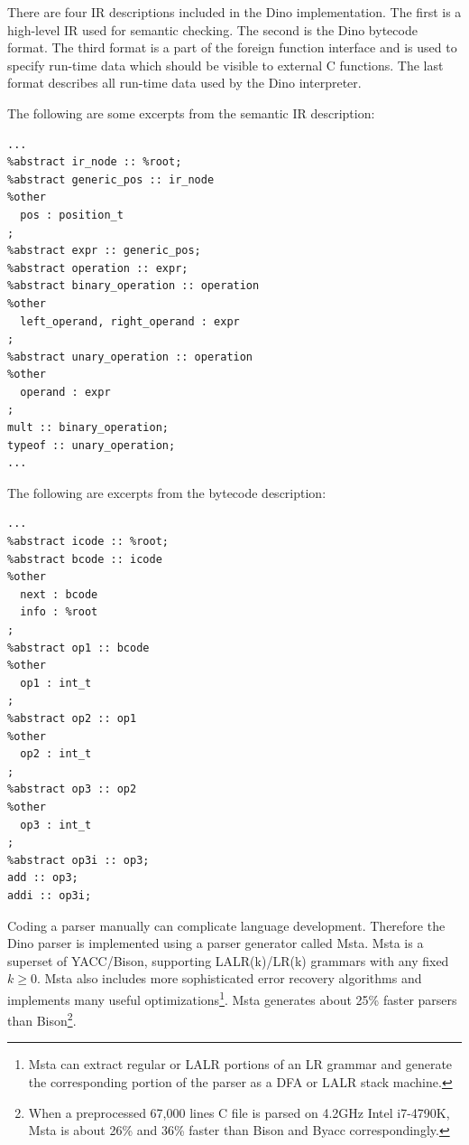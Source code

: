 \documentclass[preprint]{sigplanconf}
\begin{document}
There are four IR descriptions included in the Dino implementation.
The first is a high-level IR used for semantic checking.
The second is the Dino bytecode format. The third format
is a part of the foreign function interface and is used to specify
run-time data which should be visible to external C functions.
The last format describes all run-time data used by the Dino interpreter.

The following are some excerpts from the semantic IR description:

{\footnotesize
\begin{verbatim}
...
%abstract ir_node :: %root;
%abstract generic_pos :: ir_node
%other
  pos : position_t
;
%abstract expr :: generic_pos;
%abstract operation :: expr;
%abstract binary_operation :: operation
%other
  left_operand, right_operand : expr
;
%abstract unary_operation :: operation
%other
  operand : expr
;
mult :: binary_operation;
typeof :: unary_operation;
...
\end{verbatim}
}

The following are excerpts from the bytecode description:

{\footnotesize
\begin{verbatim}
...
%abstract icode :: %root;
%abstract bcode :: icode
%other
  next : bcode
  info : %root
;
%abstract op1 :: bcode
%other
  op1 : int_t
;
%abstract op2 :: op1
%other
  op2 : int_t
;
%abstract op3 :: op2
%other
  op3 : int_t
;
%abstract op3i :: op3;
add :: op3;
addi :: op3i;
\end{verbatim}
}

Coding a parser manually can complicate language development.
Therefore the Dino parser is implemented using a parser generator
called Msta.  Msta is a superset of YACC/Bison, supporting
LALR(k)/LR(k) grammars with any fixed $k \geq 0$.  Msta also includes more sophisticated error
recovery algorithms and implements many useful
optimizations\footnote{Msta can extract regular or LALR portions of an LR
  grammar and generate the corresponding portion of the parser
  as a DFA or LALR stack machine.}.
Msta generates about 25\% faster parsers than Bison\footnote{When a
preprocessed 67,000 lines C file is parsed on 4.2GHz Intel
i7-4790K, Msta is about 26\% and 36\% faster than Bison and Byacc correspondingly.}.
\end{document}
